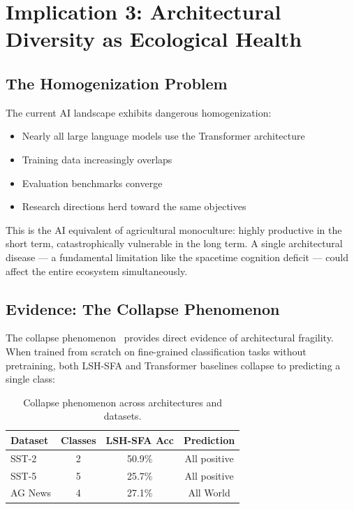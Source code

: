\documentclass{article}
\begin{document}
\section{Implication 3: Architectural Diversity as Ecological Health}

\subsection{The Homogenization Problem}

The current AI landscape exhibits dangerous homogenization:

\begin{itemize}
\item Nearly all large language models use the Transformer architecture
\item Training data increasingly overlaps
\item Evaluation benchmarks converge
\item Research directions herd toward the same objectives
\end{itemize}

This is the AI equivalent of agricultural monoculture: highly productive in the short term, catastrophically vulnerable in the long term. A single architectural disease --- a fundamental limitation like the spacetime cognition deficit --- could affect the entire ecosystem simultaneously.

\subsection{Evidence: The Collapse Phenomenon}

The collapse phenomenon~\citep{lsh-encoding-gradient} provides direct evidence of architectural fragility. When trained from scratch on fine-grained classification tasks without pretraining, both LSH-SFA and Transformer baselines collapse to predicting a single class:

\begin{table}[h]
\centering
\caption{Collapse phenomenon across architectures and datasets.}
\label{tab:collapse}
\begin{tabular}{lccc}
\toprule
\textbf{Dataset} & \textbf{Classes} & \textbf{LSH-SFA Acc} & \textbf{Prediction} \\
\midrule
SST-2 & 2 & 50.9\% & All positive \\
SST-5 & 5 & 25.7\% & All positive \\
AG News & 4 & 27.1\% & All World \\
\end{tabular}
\end{table}
\end{document}
